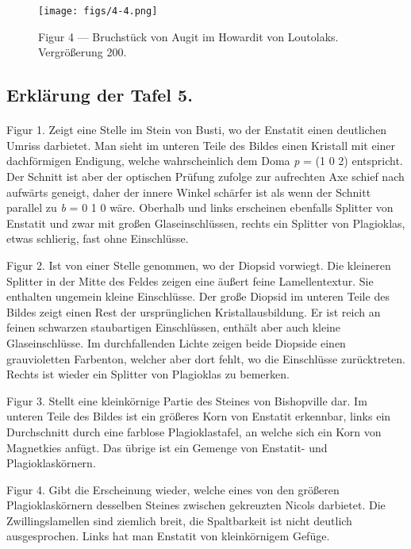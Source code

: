 \documentclass[a4paper, 11pt, oneside, polutonikogreek, german]{article}
\begin{document}
\vspace*{\fill}
\begin{figure}[H]
\centering
\texttt{[image: figs/4-4.png]}
\caption{\small Figur 4 --- Bruchstück von Augit im Howardit von Loutolaks. Vergrößerung 200.}
\end{figure}
\vspace*{\fill}
\clearpage

\subsection{Erklärung der Tafel 5.}
\paragraph{}
Figur 1. Zeigt eine Stelle im Stein von Busti, wo der Enstatit einen deutlichen Umriss darbietet. Man sieht im unteren Teile des Bildes einen Kristall mit einer dachförmigen Endigung, welche wahrscheinlich dem Doma \emph{p} = (1 0 2) entspricht. Der Schnitt ist aber der optischen Prüfung zufolge zur aufrechten Axe schief nach aufwärts geneigt, daher der innere Winkel schärfer ist als wenn der Schnitt parallel zu \emph{b} = 0 1 0 wäre. Oberhalb und links erscheinen ebenfalls Splitter von Enstatit und zwar mit großen Glaseinschlüssen, rechts ein Splitter von Plagioklas, etwas schlierig, fast ohne Einschlüsse.

Figur 2. Ist von einer Stelle genommen, wo der Diopsid vorwiegt. Die kleineren Splitter in der Mitte des Feldes zeigen eine äußert feine Lamellentextur. Sie enthalten ungemein kleine Einschlüsse. Der große Diopsid im unteren Teile des Bildes zeigt einen Rest der ursprünglichen Kristallausbildung. Er ist reich an feinen schwarzen staubartigen Einschlüssen, enthält aber auch kleine Glaseinschlüsse. Im durchfallenden Lichte zeigen beide Diopside einen grauvioletten Farbenton, welcher aber dort fehlt, wo die Einschlüsse zurücktreten. Rechts ist wieder ein Splitter von Plagioklas zu bemerken.

Figur 3. Stellt eine kleinkörnige Partie des Steines von Bishopville dar. Im unteren Teile des Bildes ist ein größeres Korn von Enstatit erkennbar, links ein Durchschnitt durch eine farblose Plagioklastafel, an welche sich ein Korn von Magnetkies anfügt. Das übrige ist ein Gemenge von Enstatit- und Plagioklaskörnern.

Figur 4. Gibt die Erscheinung wieder, welche eines von den größeren Plagioklaskörnern desselben Steines zwischen gekreuzten Nicols darbietet. Die Zwillingslamellen sind ziemlich breit, die Spaltbarkeit ist nicht deutlich ausgesprochen. Links hat man Enstatit von kleinkörnigem Gefüge.
\clearpage
\end{document}
